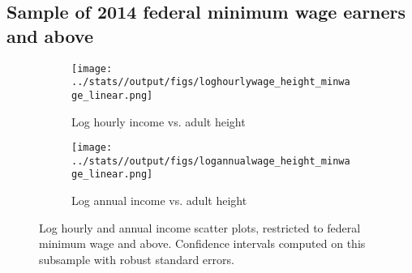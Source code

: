 \subsection{Sample of 2014 federal minimum wage earners and above}
\begin{figure}[htbp]
	\begin{subfigure}[b]{0.9\textwidth}
		\centering
		\texttt{[image: ../stats//output/figs/loghourlywage\_height\_minwage\_linear.png]}	
		\label{fig:loghourlywageheight_minwage}
		\caption{Log hourly income vs. adult height}
	\end{subfigure}
	
	\begin{subfigure}[b]{0.9\textwidth}
		\centering
		\texttt{[image: ../stats//output/figs/logannualwage\_height\_minwage\_linear.png]}	
		\label{fig:logannualwageheight_minwage}
		\caption{Log annual income vs. adult height}
	\end{subfigure}
	\caption{Log hourly and annual income scatter plots, restricted to federal minimum wage and above. Confidence intervals computed on this subsample with robust standard errors.}
\end{figure}

